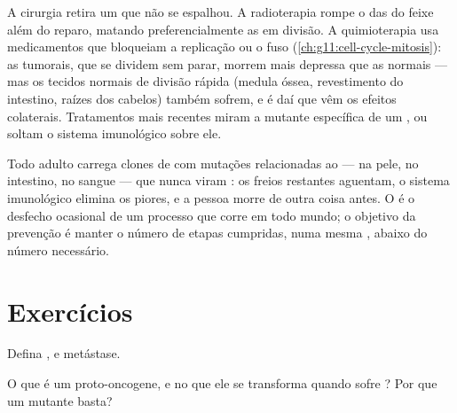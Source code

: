 \begin{example}\label{ex:g11:cancer:treatments}
A cirurgia retira um  que não se espalhou. A radioterapia rompe o
 das  do feixe além do reparo, matando preferencialmente as
 em divisão. A quimioterapia usa medicamentos que bloqueiam a
replicação ou o fuso (\cref{ch:g11:cell-cycle-mitosis}): as 
tumorais, que se dividem sem parar, morrem mais depressa que as 
normais --- mas os tecidos normais de divisão rápida (medula óssea,
revestimento do intestino, raízes dos cabelos) também sofrem, e é daí
que vêm os efeitos colaterais. Tratamentos mais recentes miram a
 mutante específica de um , ou soltam o sistema
imunológico sobre ele.
\end{example}

\begin{remark}\label{rem:g11:cancer:everyone}
Todo adulto carrega clones de  com mutações relacionadas ao
 --- na pele, no intestino, no sangue --- que nunca viram
: os freios restantes aguentam, o sistema imunológico elimina
os piores, e a pessoa morre de outra coisa antes. O  é o desfecho
ocasional de um processo que corre em todo mundo; o objetivo da
prevenção é manter o número de etapas cumpridas, numa mesma ,
abaixo do número necessário.
\end{remark}

\section{Exercícios}

\begin{exercise}[$\star$]\label{exo:g11:cancer:1}
Defina ,  e metástase.
\end{exercise}

\begin{exercise}[$\star$]\label{exo:g11:cancer:2}
O que é um proto-oncogene, e no que ele se transforma quando sofre
? Por que um  mutante basta?
\end{exercise}

